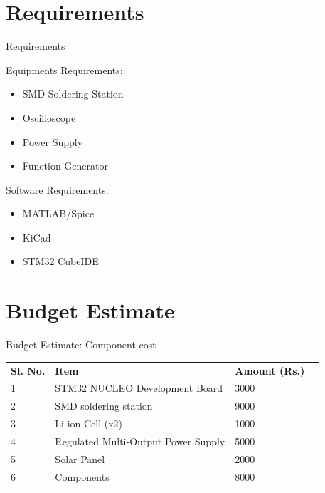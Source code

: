 \documentclass[aspectratio=169]{beamer}
\begin{document}
	\section{Requirements}
	\begin{frame}{Requirements}
		\begin{minipage}{0.5\textwidth}
			Equipments Requirements:
			\begin{itemize}
				
				\item SMD Soldering Station
				\item Oscilloscope
				\item Power Supply
				\item Function Generator
			\end{itemize} 
		\end{minipage}
		\begin{minipage}{0.3\textwidth}
			Software Requirements:
			\begin{itemize}
				
				\item MATLAB/Spice
				\item KiCad
				\item STM32 CubeIDE
				
			\end{itemize} 
			
		\end{minipage}
	\end{frame}
	
	
	
	\section{Budget Estimate}
	\begin{frame}{Budget Estimate: Component cost}
		
		\begin{table}[]
			\begin{tabular}{|l|l|l|l}
				\cline{1-3}
				\textbf{Sl. No.} & \textbf{Item}                       & \textbf{Amount (Rs.)} &  \\ \cline{1-3}
				1                & STM32 NUCLEO Development Board      & 3000                  &  \\ \cline{1-3}
				2                & SMD soldering station               & 9000                  &  \\ \cline{1-3}
				3                & Li-ion Cell (x2)                  & 1000                  &  \\ \cline{1-3}
				4                & Regulated Multi-Output Power Supply & 5000                  &  \\ \cline{1-3}
				5                & Solar Panel                         & 2000                    &  \\ \cline{1-3}
				6                & Components                          & 8000         &  \\ \cline{1-3}
			\end{tabular}
		\end{table}
		
		
		
	\end{frame}
	
\end{document}
